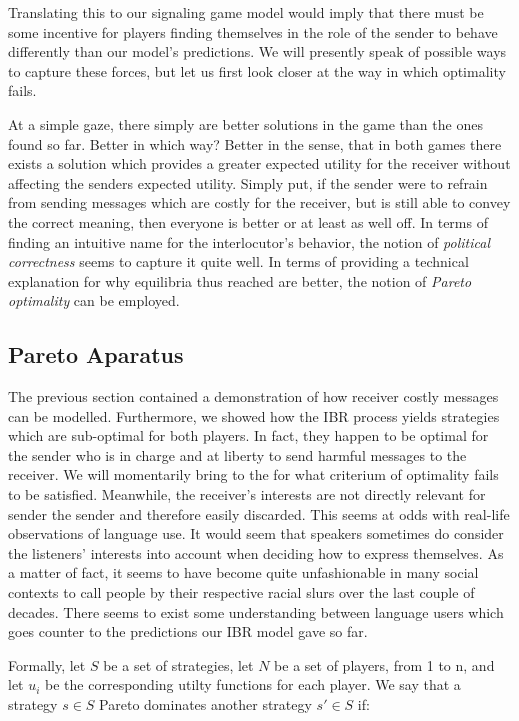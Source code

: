 \documentclass[10]{article}
\begin{document}
Translating this to our signaling game model would imply that there must be some incentive for players finding themselves in the role of the sender to behave differently than our model's predictions. We will presently speak of possible ways to capture these forces, but let us first look closer at the way in which optimality fails.

At a simple gaze, there simply are better solutions in the game than the ones found so far. Better in which way? Better in the sense, that in both games there exists a solution which provides a greater expected utility for the receiver without affecting the senders expected utility. Simply put, if the sender were to refrain from sending messages which are costly for the receiver, but is still able to convey the correct meaning, then everyone is better or at least as well off. In terms of finding an intuitive name for the interlocutor's behavior, the notion of \textit{political correctness} seems to capture it quite well. In terms of providing a technical explanation for why equilibria thus reached are better, the notion of \textit{Pareto optimality} can be employed.


\subsection{Pareto Aparatus}
The previous section contained a demonstration of how receiver costly messages can be modelled. Furthermore, we showed how the IBR process yields strategies which are sub-optimal for both players. In fact, they happen to be optimal for the sender who is in charge and at liberty to send harmful messages to the receiver. We will momentarily bring to the for what criterium of optimality fails to be satisfied. Meanwhile, the receiver's interests are not directly relevant for sender the sender and therefore easily discarded. This seems at odds with real-life observations of language use. It would seem that speakers sometimes do consider the listeners' interests into account when deciding how to express themselves. As a matter of fact, it seems to have become quite unfashionable in many social contexts to call people by their respective racial slurs over the last couple of decades. There seems to exist some understanding between language users which goes counter to the predictions our IBR model gave so far.

Formally, let $S$ be a set of strategies, let $N$ be a set of players, from 1 to n, and let $u_i$ be the corresponding utilty functions for each player. We say that a strategy $s \in S$ Pareto dominates another strategy $s' \in S$ if:
\end{document}
